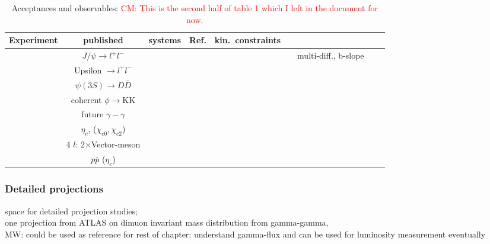 \documentclass[../report.tex]{subfiles}
\begin{document}
\begin{table}[htbp]
 {%
\centering
\begin{tabular}{|c|c|c|c|l|c|c|c|c|}
\hline
Experiment & published & systems & Ref. & kin.~constraints \\
\hline
\hline
&
$J/\psi \to l^+l^-$                    &
&
&
&
&
multi-diff., b-slope 
\\
&
Upsilon $\to l^+l^-$                   &
&
&
&
&
\\
&
$\psi(3S) \to D\bar{D}$                 &
&
&
&
&
\\
&
coherent $\phi \to$KK             &
&
&
&
&
\\
\hline
&
future $\gamma-\gamma$                 &
&
&
&
&
\\
\hline
&
$\eta_c$, ($\chi_{c0},\chi_{c2}$)    &
&
&
&
&
\\
&
4 $l$: 2$\times$Vector-meson   &
&
&
&
&
\\
&
$p\bar{p}$ ($\eta_c$)                 &
&
&
&
&
\\

\hline
\end{tabular}
\caption{Acceptances and observables: \textcolor{red}{CM: This is the second half of table 1 which I left in the document for now.}  }
}
\end{table}


\subsubsection{Detailed projections}
space for detailed projection studies; \\
one projection from ATLAS on dimuon invariant mass distribution from gamma-gamma, \\ MW: could be used as reference for rest of chapter: understand gamma-flux and can be used for luminosity measurement eventually
\end{document}
